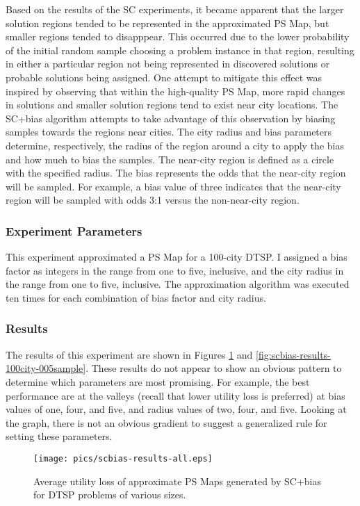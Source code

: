 Based on the results of the SC experiments, it became apparent that the larger solution regions tended to be represented in the approximated PS Map, but smaller regions tended to disapppear.  This occurred due to the lower probability of the initial random sample choosing a problem instance in that region, resulting in either a particular region not being represented in discovered solutions or probable solutions being assigned.  One attempt to mitigate this effect was inspired by observing that within the high-quality PS Map, more rapid changes in solutions and smaller solution regions tend to exist near city locations.  The SC+bias algorithm attempts to take advantage of this observation by biasing samples towards the regions near cities.  The city radius and bias parameters determine, respectively, the radius of the region around a city to apply the bias and how much to bias the samples.  The near-city region is defined as a circle with the specified radius.  The bias represents the odds that the near-city region will be sampled.  For example, a bias value of three indicates that the near-city region will be sampled with odds 3:1 versus the non-near-city region.  

\subsubsection{Experiment Parameters} This experiment approximated a PS Map for a 100-city DTSP.  I assigned a bias factor as integers in the range from one to five, inclusive, and the city radius in the range from one to five, inclusive. The approximation algorithm was executed ten times for each combination of bias factor and city radius.

\subsubsection{Results} The results of this experiment are shown in Figures \ref{fig:scbias-results-all} and \ref{fig:scbias-results-100city-005sample}.  These results do not appear to show an obvious pattern to determine which parameters are most promising.  For example, the best performance are at the valleys (recall that lower utility loss is preferred)  at bias values of one, four, and five, and radius values of two, four, and five.  Looking at the graph, there is not an obvious gradient to suggest a generalized rule for setting these parameters.



\begin{figure}
\begin{center}
\texttt{[image: pics/scbias-results-all.eps]}
\caption{Average utility loss of approximate PS Maps generated by SC+bias for DTSP problems of various sizes.}
\label{fig:scbias-results-all}
\end{center}
\end{figure}

